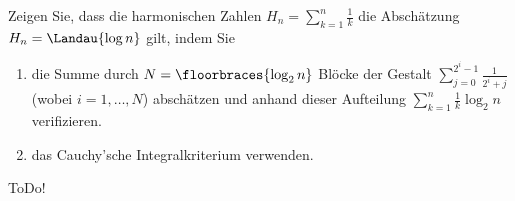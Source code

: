 
\begin{exercise}

Zeigen Sie, dass die harmonischen Zahlen $H_n = \sum_{k=1}^n \frac{1}{k}$ die Abschätzung $H_n = \Landau{\log{n}}$ gilt, indem Sie

\begin{enumerate}
    \item die Summe durch $N = \floorbraces{\log_2{n}}$ Blöcke der Gestalt $\sum_{j=0}^{2^i - 1} \frac{1}{2^i + j}$ (wobei $i= 1, \ldots, N$) abschätzen und anhand dieser Aufteilung $\sum_{k=1}^n \frac{1}{k} \log_2{n}$ verifizieren.
    \item das Cauchy’sche Integralkriterium verwenden.
\end{enumerate}

\end{exercise}


\begin{solution}

ToDo!

\end{solution}


